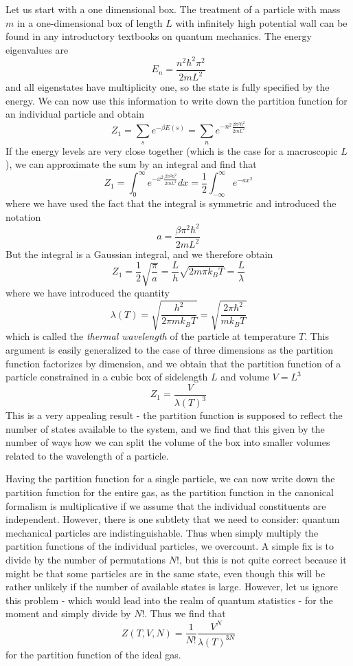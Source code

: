 \documentclass[a4paper, draft]{article}
\theoremstyle{own}
\theoremstyle{remark}
\begin{document}
Let us start with a one dimensional box. The treatment of a particle with mass $m$ in a one-dimensional box of length $L$ with infinitely high potential wall can be found in any introductory textbooks on quantum mechanics. The energy eigenvalues are
$$
E_n = \frac{n^2 \hbar^2 \pi^2}{2m L^2}
$$
and all eigenstates have multiplicity one, so the state is fully specified by the energy. 
We can now use this information to write down the partition function for an individual particle and obtain
$$
Z_1 = \sum_s e^{-\beta E(s)} = \sum_n e^{- n^2 \frac{\beta \pi^2 \hbar^2}{2mL^2}} 
$$
If the energy levels are very close together (which is the case for a macroscopic $L$), we can approximate the sum by an integral and find that
$$
Z_1 = \int_0^\infty e^{-x^2 \frac{\beta \pi^2 \hbar^2}{2mL^2}} dx = 
\frac{1}{2}  \int_{-\infty}^\infty e^{-ax^2}
$$
where we have used the fact that the integral is symmetric and introduced the notation
$$
a = \frac{\beta \pi^2 \hbar^2}{2mL^2}
$$
But the integral is a Gaussian integral, and we therefore obtain
$$
Z_1 = \frac{1}{2} \sqrt{\frac{\pi}{a}} = \frac{L}{h} \sqrt{2m\pi k_B T} = \frac{L}{\lambda}
$$
where we have introduced the quantity 
$$
\lambda(T) = \sqrt{\frac{h^2}{2\pi m k_B T}} = \sqrt{\frac{2\pi \hbar^2}{m k_B T}}
$$
which is called the {\em thermal wavelength} of the particle at temperature $T$. This argument is easily generalized to the case of three dimensions as the partition function factorizes by dimension, and we obtain that the partition function of a particle constrained in a cubic box of sidelength $L$ and volume $V = L^3$
$$
Z_1 = \frac{V} {\lambda(T)^3}
$$
This is a very appealing result - the partition function is supposed to reflect the number of states available to the system, and we find that this given by the number of ways how we can split the volume of the box into smaller volumes related to the wavelength of a particle.

Having the partition function for a single particle, we can now write down the partition function for the entire gas, as the partition function in the canonical formalism is multiplicative if we assume that the individual constituents are independent. However, there is one subtlety that we need to consider: quantum mechanical particles are indistinguishable. Thus when simply multiply the partition functions of the individual particles, we overcount. A simple fix is to divide by the number of permutations $N!$, but this is not quite correct because it might be that some particles are in the same state, even though this will be rather unlikely if the number of available states is large. However, let us ignore this problem - which would lead into the realm of quantum statistics - for the moment and simply divide by $N!$. Thus we find that
$$
Z(T,V,N) = \frac{1}{N!} \frac{V^N}{\lambda(T)^{3N}}
$$
for the partition function of the ideal gas. 
\end{document}
